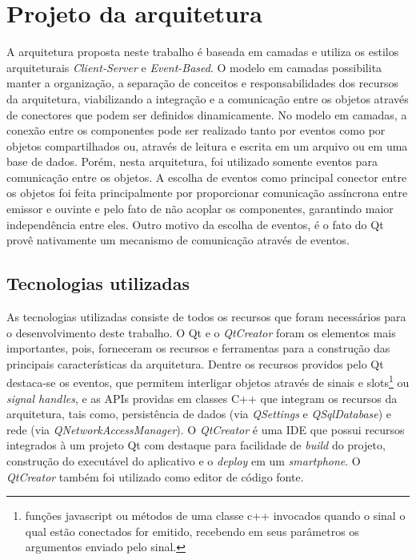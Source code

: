 \section{Projeto da arquitetura}
A arquitetura proposta neste trabalho é baseada em camadas e utiliza os estilos arquiteturais \textit{Client-Server} e \textit{Event-Based}. O modelo em camadas possibilita manter a organização, a separação de conceitos e responsabilidades dos recursos da arquitetura, viabilizando a integração e a comunicação entre os objetos através de conectores que podem ser definidos dinamicamente. No modelo em camadas, a conexão entre os componentes pode ser realizado tanto por eventos como por objetos compartilhados ou, através de leitura e escrita em um arquivo ou em uma base de dados. Porém, nesta arquitetura, foi utilizado somente eventos para comunicação entre os objetos. A escolha de eventos como principal conector entre os objetos foi feita principalmente por proporcionar comunicação assíncrona entre emissor e ouvinte e pelo fato de não acoplar os componentes, garantindo maior independência entre eles. Outro motivo da escolha de eventos, é o fato do Qt provê nativamente um mecanismo de comunicação através de eventos.\par


\subsection{Tecnologias utilizadas}
As tecnologias utilizadas consiste de todos os recursos que foram necessários para o desenvolvimento deste trabalho. O Qt e o \textit{QtCreator} foram os elementos mais importantes, pois, forneceram os recursos e ferramentas para a construção das principais características da arquitetura. Dentre os recursos providos pelo Qt destaca-se os eventos, que permitem interligar objetos através de sinais e slots\footnote{funções javascript ou métodos de uma classe c++ invocados quando o sinal o qual estão conectados for emitido, recebendo em seus parâmetros os argumentos enviado pelo sinal.} ou \textit{signal handles}, e as APIs providas em classes C++ que integram os recursos da arquitetura, tais como, persistência de dados (via \textit{QSettings} e \textit{QSqlDatabase}) e rede (via \textit{QNetworkAccessManager}). O \textit{QtCreator} é uma IDE que possui recursos integrados à um projeto Qt com destaque para facilidade de \textit{build} do projeto, construção do executável do aplicativo e o \textit{deploy} em um \textit{smartphone}. O \textit{QtCreator} também foi utilizado como editor de código fonte.


